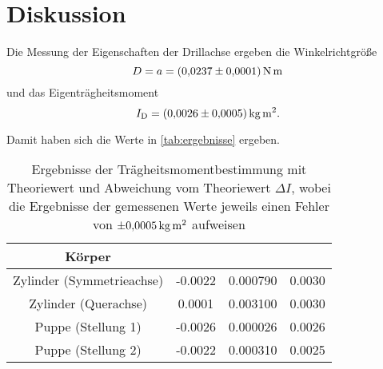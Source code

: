 \section{Diskussion}
\label{sec:Diskussion}


Die Messung der Eigenschaften der Drillachse ergeben die Winkelrichtgröße
\begin{equation}
    D = a = \SI{0.0237+-0.0001}{\newton\meter}
\end{equation}
und das Eigenträgheitsmoment
\begin{equation}
    I_\text{D} = \SI{0.0026+-0.0005}{\kilo\gram\meter\squared}.
\end{equation}

Damit haben sich die Werte in \autoref{tab:ergebnisse} ergeben.

\begin{table}
    \centering
    \begin{tabular}{c S[table-format=-1.4] S[table-format=1.6] S[table-format=1.4]}
        \toprule
        Körper &  &  &  \\
        \midrule
        Zylinder (Symmetrieachse) & -0.0022 & 0.000790 & 0.0030 \\
        Zylinder (Querachse) & 0.0001 & 0.003100 & 0.0030 \\
        Puppe (Stellung 1) & -0.0026 & 0.000026 & 0.0026 \\
        Puppe (Stellung 2) & -0.0022 & 0.000310 & 0.0025 \\
        \bottomrule
    \end{tabular}
    \caption{Ergebnisse der Trägheitsmomentbestimmung mit Theoriewert und Abweichung vom Theoriewert $\Delta I$, wobei die Ergebnisse der gemessenen Werte jeweils einen Fehler von $\SI{+-0.0005}{\kilo\gram\meter\squared}$ aufweisen}
    \label{tab:ergebnisse}
\end{table}

